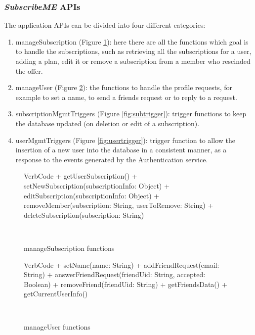 \documentclass[12pt]{article}
\begin{document}
\subsubsection{\textit{SubscribeME} APIs}
The application APIs can be divided into four different categories: \begin{enumerate}
    \item manageSubscription (Figure \ref{fig:manageSub}): here there are all the functions which goal is to handle the subscriptions, such as retrieving all the subscriptions for a user, adding a plan, edit it or remove a subscription from a member who rescinded the offer.

    \item manageUser (Figure \ref{fig:manageUs}): the functions to handle the profile requests, for example to set a name, to send a friends request or to reply to a request.
    \item subscriptionMgmtTriggers (Figure \ref{fig:subtrigger}): trigger functions to keep the database updated (on deletion or edit of a subscription).
    \item userMgmtTriggers (Figure \ref{fig:usertrigger}): trigger function to allow the insertion of a new user into the database in a consistent manner, as a response to the events generated by the Authentication service.
\end{enumerate}

\begin{figure}[h!]
    \centering
    \begin{SaveVerbatim}{VerbCode}
        + getUserSubscription()
        + setNewSubscription(subscriptionInfo: Object{})
        + editSubscription(subscriptionInfo: Object{})
        + removeMember(subscription: String, userToRemove: String)
        + deleteSubscription(subscription: String)
    \end{SaveVerbatim}
    \setlength{\fboxsep}{5mm}
    \caption{manageSubscription functions}~\label{fig:manageSub}
\end{figure}

\begin{figure}[h!]
    \centering
    \begin{SaveVerbatim}{VerbCode}
        + setName(name: String)
        + addFriendRequest(email: String)
        + answerFriendRequest(friendUid: String, accepted: Boolean)
        + removeFriend(friendUid: String)
        + getFriendsData()
        + getCurrentUserInfo()
    \end{SaveVerbatim}
    \setlength{\fboxsep}{5mm}
    \caption{manageUser functions}~\label{fig:manageUs}
\end{figure}
\end{document}
